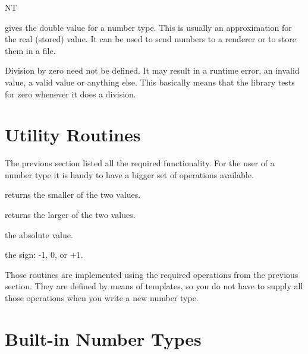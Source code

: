 \begin{class} {NT}
       {}

         {gives the double value for a number type.
          This is usually an approximation for the real (stored) value.
          It can be used to send numbers to a renderer or to store them 
          in a file.}


       {%
Division by zero need not be defined. It may result in a runtime error, an
invalid value, a valid value or anything else. This basically means that the
library tests for zero whenever it does a division.}

\section{Utility Routines}

The previous section listed all the required functionality.
For the user of a number type it is handy to have a bigger set of
operations available.



{returns the smaller of the two values.}

{returns the larger of the two values.}

{the absolute value.}


{the sign: -1, 0, or $+1$.}

{}

{}

{}

{}

Those routines are implemented using the required operations from the
previous section. They are defined by means of templates, so you do not
have to supply all those operations when you write  a new number type.

\end{class} 

\section{Built-in Number Types}

